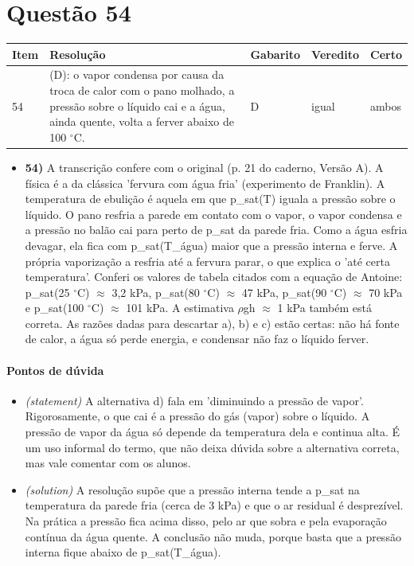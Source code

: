 \documentclass{article}%
\begin{document}
\section*{Questão 54}%
\begin{longtable}{@{}p{} p{} p{} p{} p{}@{}}\toprule Item & Resolução & Gabarito & Veredito & Certo \\ \midrule
54 & (D): o vapor condensa por causa da troca de calor com o pano molhado, a pressão sobre o líquido cai e a água, ainda quente, volta a ferver abaixo de 100 $^\circ$C. & D & igual & ambos \\
\bottomrule\end{longtable}%
\begin{itemize}%
\item%
\textbf{54)} A transcrição confere com o original (p. 21 do caderno, Versão A). A física é a da clássica 'fervura com água fria' (experimento de Franklin). A temperatura de ebulição é aquela em que p\_sat(T) iguala a pressão sobre o líquido. O pano resfria a parede em contato com o vapor, o vapor condensa e a pressão no balão cai para perto de p\_sat da parede fria. Como a água esfria devagar, ela fica com p\_sat(T\_água) maior que a pressão interna e ferve. A própria vaporização a resfria até a fervura parar, o que explica o 'até certa temperatura'. Conferi os valores de tabela citados com a equação de Antoine: p\_sat(25 $^\circ$C) $\approx$ 3,2 kPa, p\_sat(80 $^\circ$C) $\approx$ 47 kPa, p\_sat(90 $^\circ$C) $\approx$ 70 kPa e p\_sat(100 $^\circ$C) $\approx$ 101 kPa. A estimativa $\rho$gh $\approx$ 1 kPa também está correta. As razões dadas para descartar a), b) e c) estão certas: não há fonte de calor, a água só perde energia, e condensar não faz o líquido ferver.%
\end{itemize}%
\paragraph{Pontos de dúvida}%
\begin{itemize}%
\item%
\textit{(statement)} A alternativa d) fala em 'diminuindo a pressão de vapor'. Rigorosamente, o que cai é a pressão do gás (vapor) sobre o líquido. A pressão de vapor da água só depende da temperatura dela e continua alta. É um uso informal do termo, que não deixa dúvida sobre a alternativa correta, mas vale comentar com os alunos.%
\item%
\textit{(solution)} A resolução supõe que a pressão interna tende a p\_sat na temperatura da parede fria (cerca de 3 kPa) e que o ar residual é desprezível. Na prática a pressão fica acima disso, pelo ar que sobra e pela evaporação contínua da água quente. A conclusão não muda, porque basta que a pressão interna fique abaixo de p\_sat(T\_água).%
\end{itemize}%
\end{document}

